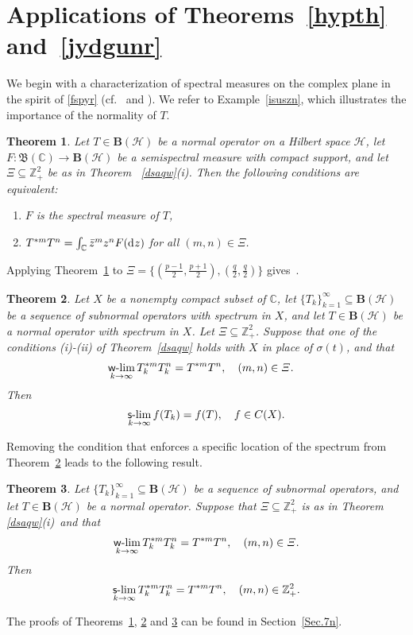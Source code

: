 \documentclass[reqno]{amsproc}
\numberwithin{equation}{section}
\newtheorem{theorem}{Theorem}[section]
\theoremstyle{remark}
\newcommand*{\hh}{\mathcal{H}}
\newcommand*{\comp}{\mathbb{C}}
\newcommand*{\borel}{\mathfrak{B}}
\newcommand*{\bou}{\boldsymbol{B}}
\newcommand*{\cbb}{\comp}
\newcommand*{\D}{\mathrm{d\hspace{.1ex}}}
\theoremstyle{definition}
\newcommand*{\ogr}{\boldsymbol{B}}
\newcommand*{\zbb}{\mathbb{Z}}
\def\sslim{\qopname\relax m{{\sf{s}\textrm-}lim}}
\def\wwlim{\qopname\relax m{{\sf{w}\textrm-}lim}}
\begin{document}
   \section{Applications of Theorems~\ref{hypth}
and~\ref{jydgunr}}
   We begin with a characterization of spectral
measures on the complex plane in the spirit of
\eqref{fspyr} (cf.\ \cite{P-S21} and \cite{P-S22-b}).
We refer to Example~\ref{isuszn}, which illustrates
the importance of the normality of $T$.
   \begin{theorem} \label{specth}
Let $T\in \ogr(\hh)$ be a normal operator on a Hilbert
space $\hh$, let $F\colon \borel(\cbb) \to \ogr(\hh)$
be a semispectral measure with compact support, and
let $\varXi \subseteq \zbb_+^2$ be as in Theorem~{\em
\ref{dsaqw}(i)}. Then the following conditions are
equivalent{\em :}
   \begin{enumerate}
   \item[(i)] $F$ is the spectral measure of $T$,
   \item[(ii)] $T^{*m}T^{n}=\int_{\cbb} \bar{z}^{m} z^{n} F(\D z)$
for all $(m,n)\in \varXi$.
   \end{enumerate}
   \end{theorem}
Applying Theorem~\ref{specth} to
$\varXi=\big\{(\frac{p-1}{2},\frac{p+1}{2}),
(\frac{q}{2},\frac{q}{2})\big\}$
gives~\cite[Theorem~1.7]{P-S22-b}.
   \begin{theorem}\label{sotwotth}
Let $X$ be a nonempty compact subset of $\cbb$, let
$\{T_k\}_{k=1}^{\infty} \subseteq \bou(\hh)$ be a
sequence of subnormal operators with spectrum in $X$,
and let $T\in \bou(\hh)$ be a normal operator with
spectrum in $X$. Let $\varXi\subseteq \zbb_+^2$.
Suppose that one of the conditions {\em (i)-(ii)} of
Theorem~{\em \ref{dsaqw}} holds with $X$ in place of
$\sigma(t)$, and that
   \begin{align*}
\wwlim_{k\to\infty} T_k^{*m}T_k^n & = T^{*m}T^n, \quad
(m,n)\in \varXi.
   \end{align*}
Then
   \begin{align} \label{dycnim}
\sslim_{k\to \infty} f(T_k) = f(T), \quad f\in C(X).
   \end{align}
   \end{theorem}
Removing the condition that enforces a specific
location of the spectrum from Theorem~\ref{sotwotth}
leads to the following result.
   \begin{theorem}
\label{wszb} Let $\{T_k\}_{k=1}^{\infty} \subseteq
\bou(\hh)$ be a sequence of subnormal operators, and
let $T\in \bou(\hh)$ be a normal operator. Suppose
that $\varXi\subseteq \zbb_+^2$ is as in Theorem~{\em
\ref{dsaqw}(i)}~and that
   \begin{align*}
\wwlim_{k\to\infty} T_k^{*m}T_k^n = T^{*m}T^n, \quad
(m,n)\in \varXi.
   \end{align*}
Then
   \begin{align} \label{woso}
\sslim_{k\to\infty} T_k^{*m}T_k^n= T^{*m}T^n, \quad
(m,n)\in \zbb_+^2.
   \end{align}
   \end{theorem}
The proofs of Theorems~\ref{specth}, \ref{sotwotth}
and \ref{wszb} can be found in Section~\ref{Sec.7n}.
\end{document}
